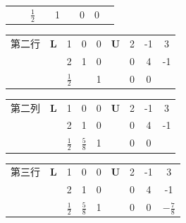 \begin{example}
\begin{solution}
\begin{table}[H]
\begin{tabular}{cc|c|c|c|c|c|c|c|}
                \cline{3-5}\cline{7-9}        &     & \cellcolor[rgb]{ 1,  1,  0}$\frac{1}{2}$ &     & 1   &     & 0   & 0   &  \bigstrut\\
                \cline{3-5}\cline{7-9}    
            \end{tabular}%
        \end{table}%
        \begin{table}[H]
            \centering
            \begin{tabular}{cc|c|c|c|c|c|c|c|}
                \cline{3-5}\cline{7-9}    第二行 & $\boldsymbol{L}$ & 1   & 0   & 0   & $\boldsymbol{U}$ & 2   & -1  & 3 \bigstrut\\
                \cline{3-5}\cline{7-9}        &     & 2   & 1   & 0   &     & 0   & \cellcolor[rgb]{ 1,  1,  0}4 & \cellcolor[rgb]{ 1,  1,  0}-1 \bigstrut\\
                \cline{3-5}\cline{7-9}        &     & $\frac{1}{2}$ &     & 1   &     & 0   & 0   &  \bigstrut\\
                \cline{3-5}\cline{7-9}    
            \end{tabular}%
        \end{table}%
        \begin{table}[H]
            \centering
            \begin{tabular}{cc|c|c|c|c|c|c|c|}
                \cline{3-5}\cline{7-9}    第二列 & $\boldsymbol{L}$ & 1   & 0   & 0   & $\boldsymbol{U}$ & 2   & -1  & 3 \bigstrut\\
                \cline{3-5}\cline{7-9}        &     & 2   & 1   & 0   &     & 0   & 4   & -1 \bigstrut\\
                \cline{3-5}\cline{7-9}        &     & $\frac{1}{2}$ & \cellcolor[rgb]{ 1,  1,  0}$\frac{5}{8}$ & 1   &     & 0   & 0   &  \bigstrut\\
                \cline{3-5}\cline{7-9}    
            \end{tabular}%
          \end{table}%
          \begin{table}[H]
            \centering
            \begin{tabular}{cc|c|c|c|c|c|c|c|}
                \cline{3-5}\cline{7-9}    第三行 & $\boldsymbol{L}$ & 1   & 0   & 0   & $\boldsymbol{U}$ & 2   & -1  & 3 \bigstrut\\
                \cline{3-5}\cline{7-9}        &     & 2   & 1   & 0   &     & 0   & 4   & -1 \bigstrut\\
                \cline{3-5}\cline{7-9}        &     & $\frac{1}{2}$ & $\frac{5}{8}$ & 1   &     & 0   & 0   & \cellcolor[rgb]{ 1,  1,  0}$-\frac{7}{8}$ \bigstrut\\
                \cline{3-5}\cline{7-9}    
            \end{tabular}%
        \end{table}%
    \end{solution}
\end{example}
